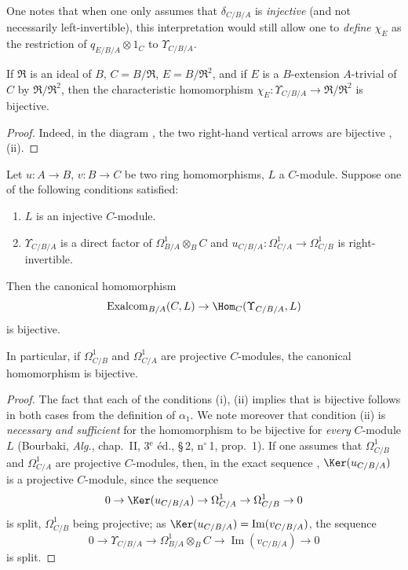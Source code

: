 One notes that when one only assumes that $\delta_{C/B/A}$ is \emph{injective} (and not necessarily left-invertible), this interpretation would still allow one to \emph{define} $\chi_E$ as the restriction of $q_{E/B/A}\otimes 1_C$ to $\Upsilon_{C/B/A}$.

\begin{corollary}[20.6.10]
\label{0.20.6.10}
If $\mathfrak{R}$ is an ideal of $B$, $C=B/\mathfrak{R}$, $E=B/\mathfrak{R}^2$, and if $E$ is a $B$-extension $A$-trivial  of $C$ by $\mathfrak{R}/\mathfrak{R}^2$, then the characteristic homomorphism $\chi_E:\Upsilon_{C/B/A}\to\mathfrak{R}/\mathfrak{R}^2$ is bijective.
\end{corollary}

\begin{proof}
Indeed, in the diagram , the two right-hand vertical arrows are bijective , (ii).
\end{proof}

\begin{theorem}[20.6.11]
\label{0.20.6.11}
Let $u:A\to B$, $v:B\to C$ be two ring homomorphisms, $L$ a $C$-module.
Suppose one of the following conditions satisfied:
\begin{enumerate}
  \item[\rm(i)] $L$ is an injective $C$-module.
  \item[\rm(ii)] $\Upsilon_{C/B/A}$ is a direct factor of $\Omega^1_{B/A}\otimes_B C$ and $u_{C/B/A}:\Omega^1_{C/A}\to\Omega^1_{C/B}$ is right-invertible.
\end{enumerate}
Then the canonical homomorphism 
\[
  \operatorname{Exalcom}_{B/A}(C,L)\to\Hom_C(\Upsilon_{C/B/A},L)
\]
is bijective.

In particular, if $\Omega^1_{C/B}$ and $\Omega^1_{C/A}$ are projective $C$-modules, the canonical homomorphism  is bijective.
\end{theorem}

\begin{proof}
The fact that each of the conditions (i), (ii) implies that  is bijective follows in both cases from the definition of $\alpha_1$.
We note moreover that condition (ii) is \emph{necessary and sufficient} for the homomorphism  to be bijective for \emph{every} $C$-module $L$ (Bourbaki, \emph{Alg.}, chap.~II, 3$^\text{e}$ \'{e}d., \S\,2, n$^\circ$\,1, prop.~1).
If one assumes that $\Omega^1_{C/B}$ and $\Omega^1_{C/A}$ are projective $C$-modules, then, in the exact sequence , $\Ker(u_{C/B/A})$ is a projective $C$-module, since the sequence
\[
  0\to\Ker(u_{C/B/A})\to\Omega^1_{C/A}\to\Omega^1_{C/B}\to 0
\]
is split, $\Omega^1_{C/B}$ being projective; as $\Ker(u_{C/B/A})=\operatorname{Im}(v_{C/B/A})$, the sequence
\[
  0\to\Upsilon_{C/B/A}\to\Omega^1_{B/A}\otimes_B C\to\operatorname{Im}(v_{C/B/A})\to 0
\]
is split.
\end{proof}

